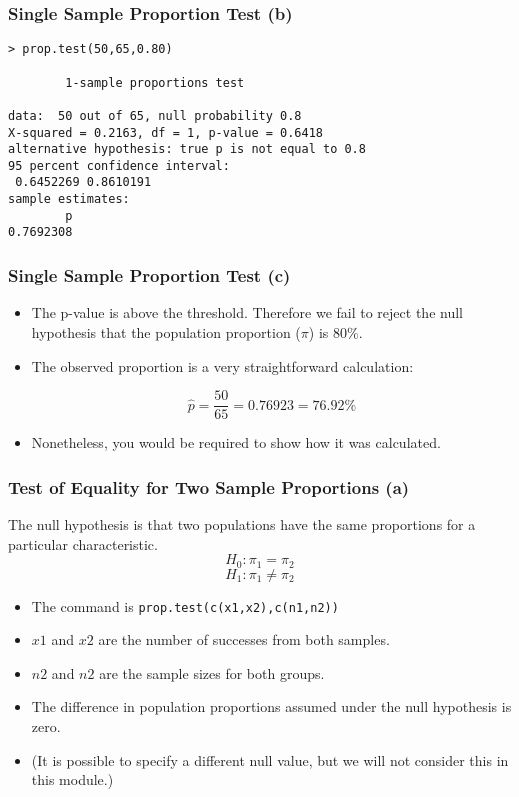 \documentclass[a4]{beamer}
\begin{document}
\begin{frame}[fragile]
\frametitle{Single Sample Proportion Test (b)}

\begin{verbatim}
> prop.test(50,65,0.80)

        1-sample proportions test 

data:  50 out of 65, null probability 0.8
X-squared = 0.2163, df = 1, p-value = 0.6418
alternative hypothesis: true p is not equal to 0.8
95 percent confidence interval:
 0.6452269 0.8610191
sample estimates:
        p
0.7692308
\end{verbatim}

\end{frame}

\begin{frame}[fragile]
\frametitle{Single Sample Proportion Test (c)}

\begin{itemize}
\item The p-value is above the threshold. Therefore we fail to reject the null hypothesis that the population proportion ($\pi$) is $80\%$.

\item The observed proportion is a very straightforward calculation:

\[ \hat{p} = \frac{50}{65} = 0.76923= 76.92\%\]
\item Nonetheless, you would be required to show how it was calculated.
\end{itemize}

\end{frame}

\begin{frame}[fragile]
\frametitle{Test of Equality for Two Sample Proportions (a)}
The null hypothesis is that two populations have the same proportions for a particular characteristic.
\[H_0 : \pi_1 = \pi_2 \]
\[H_1 : \pi_1 \neq \pi_2 \]
\begin{itemize}
\item The command is \texttt{prop.test(c(x1,x2),c(n1,n2))}
\item $x1$ and $x2$ are the number of successes from both samples.
\item $n2$ and $n2$ are the sample sizes for both groups.
\item The difference in population proportions assumed under the null hypothesis is zero.
\item (It is possible to specify a different null value, but we will not consider this in this module.)
\end{itemize}
\end{frame}
\end{document}
